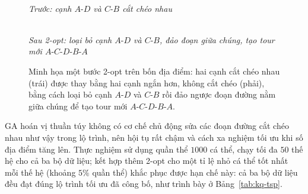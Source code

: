 \begin{figure}[H]
\centering
\begin{minipage}{0.42\linewidth}
\centering
{}
\\[0.3em]
\textit{Trước: cạnh $A\text{-}D$ và $C\text{-}B$ cắt chéo nhau}
\end{minipage}
\hfill
\begin{minipage}{0.42\linewidth}
\centering
{}
\\[0.3em]
\textit{Sau 2-opt: loại bỏ cạnh $A\text{-}D$ và $C\text{-}B$, đảo đoạn
giữa chúng, tạo tour mới $A\text{-}C\text{-}D\text{-}B\text{-}A$}
\end{minipage}
\caption{Minh họa một bước 2-opt trên bốn địa điểm: hai cạnh cắt chéo
nhau (trái) được thay bằng hai cạnh ngắn hơn, không cắt chéo (phải),
bằng cách loại bỏ cạnh $A\text{-}D$ và $C\text{-}B$ rồi đảo ngược đoạn
đường nằm giữa chúng để tạo tour mới $A\text{-}C\text{-}D\text{-}B\text{-}A$.}
\label{fig:2-opt-minh-hoa}
\end{figure}

GA hoán vị thuần túy không có cơ chế chủ động sửa các đoạn đường cắt
chéo nhau như vậy trong lộ trình, nên hội tụ rất chậm và cách xa
nghiệm tối ưu khi số địa điểm tăng lên. Thực nghiệm sử dụng quần thể
$1000$ cá thể, chạy tối đa $50$ thế hệ cho cả ba bộ dữ liệu; kết hợp
thêm 2-opt cho một tỉ lệ nhỏ cá thể tốt nhất mỗi thế hệ (khoảng $5\%$
quần thể) khắc phục được hạn chế này: cả ba bộ dữ liệu đều đạt đúng lộ
trình tối ưu đã công bố, như trình bày ở Bảng~\ref{tab:kq-tsp}.

